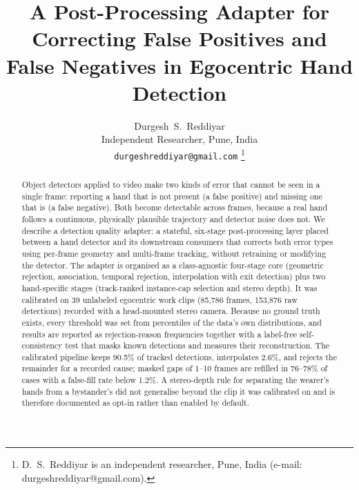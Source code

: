 \documentclass[journal]{IEEEtran}
\begin{document}
\title{A Post-Processing Adapter for Correcting False Positives and False Negatives in Egocentric Hand Detection}

\author{Durgesh~S.~Reddiyar\\
{\normalsize Independent Researcher, Pune, India}\\
{\normalsize\texttt{durgeshreddiyar@gmail.com}}%
\thanks{D.~S.~Reddiyar is an independent researcher, Pune, India (e-mail: durgeshreddiyar@gmail.com).}}


\maketitle

\begin{abstract}
Object detectors applied to video make two kinds of error that cannot be seen in a single frame: reporting a hand that is not present (a false positive) and missing one that is (a false negative). Both become detectable across frames, because a real hand follows a continuous, physically plausible trajectory and detector noise does not. We describe a detection quality adapter: a stateful, six-stage post-processing layer placed between a hand detector and its downstream consumers that corrects both error types using per-frame geometry and multi-frame tracking, without retraining or modifying the detector. The adapter is organised as a class-agnostic four-stage core (geometric rejection, association, temporal rejection, interpolation with exit detection) plus two hand-specific stages (track-ranked instance-cap selection and stereo depth). It was calibrated on 39 unlabeled egocentric work clips (85,786 frames, 153,876 raw detections) recorded with a head-mounted stereo camera. Because no ground truth exists, every threshold was set from percentiles of the data's own distributions, and results are reported as rejection-reason frequencies together with a label-free self-consistency test that masks known detections and measures their reconstruction. The calibrated pipeline keeps 90.5\% of tracked detections, interpolates 2.6\%, and rejects the remainder for a recorded cause; masked gaps of 1--10 frames are refilled in 76--78\% of cases with a false-fill rate below 1.2\%. A stereo-depth rule for separating the wearer's hands from a bystander's did not generalise beyond the clip it was calibrated on and is therefore documented as opt-in rather than enabled by default.
\end{abstract}
\end{document}

